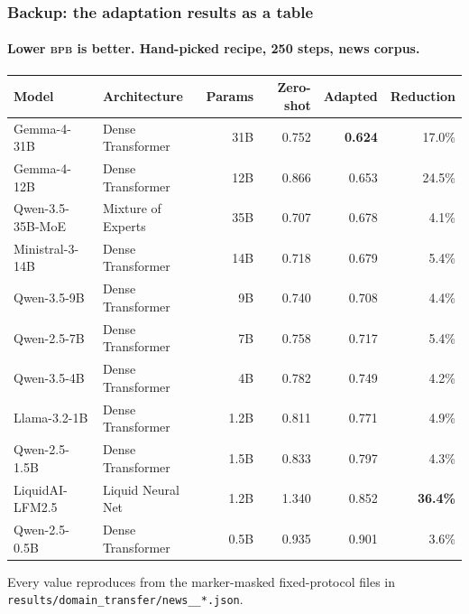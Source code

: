 \documentclass[aspectratio=169,11pt]{beamer}
\newcommand{\bpb}{\textsc{bpb}}
\begin{document}
\begin{frame}
  \frametitle{Backup: the adaptation results as a table}
  \framesubtitle{Lower \bpb{} is better. Hand-picked recipe, 250 steps, news corpus.}

  \vspace{0.3em}
  \begin{center}
  \renewcommand{\arraystretch}{1.08}
  \scriptsize
  \begin{tabular}{llrrrr}
    \toprule
    \textbf{Model} & \textbf{Architecture} & \textbf{Params} &
    \textbf{Zero-shot} & \textbf{Adapted} & \textbf{Reduction} \\
    \midrule
    Gemma-4-31B        & Dense Transformer  & 31B   & 0.752 & \textbf{0.624} & 17.0\% \\
    Gemma-4-12B        & Dense Transformer  & 12B   & 0.866 & 0.653 & 24.5\% \\
    \rowcolor{wash} Qwen-3.5-35B-MoE   & Mixture of Experts & 35B   & 0.707 & 0.678 & \phantom{0}4.1\% \\
    Ministral-3-14B    & Dense Transformer  & 14B   & 0.718 & 0.679 & \phantom{0}5.4\% \\
    Qwen-3.5-9B        & Dense Transformer  & 9B    & 0.740 & 0.708 & \phantom{0}4.4\% \\
    Qwen-2.5-7B        & Dense Transformer  & 7B    & 0.758 & 0.717 & \phantom{0}5.4\% \\
    Qwen-3.5-4B        & Dense Transformer  & 4B    & 0.782 & 0.749 & \phantom{0}4.2\% \\
    Llama-3.2-1B       & Dense Transformer  & 1.2B  & 0.811 & 0.771 & \phantom{0}4.9\% \\
    Qwen-2.5-1.5B      & Dense Transformer  & 1.5B  & 0.833 & 0.797 & \phantom{0}4.3\% \\
    \rowcolor{wash} LiquidAI-LFM2.5    & Liquid Neural Net  & 1.2B  & 1.340 & 0.852 & \textbf{36.4\%} \\
    Qwen-2.5-0.5B      & Dense Transformer  & 0.5B  & 0.935 & 0.901 & \phantom{0}3.6\% \\
    \bottomrule
  \end{tabular}
  \end{center}

  \vspace{0.5em}
  \footnotesize
  Every value reproduces from the marker-masked fixed-protocol files in
  \texttt{results/domain\_transfer/news\_\_*.json}.
\end{frame}
\end{document}
